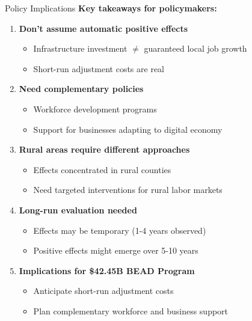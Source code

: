 \documentclass[aspectratio=169]{beamer}
\begin{document}
\begin{frame}{Policy Implications}
\textbf{Key takeaways for policymakers:}

\begin{enumerate}
    \item \textbf{Don't assume automatic positive effects}
    \begin{itemize}
        \item Infrastructure investment $\neq$ guaranteed local job growth
        \item Short-run adjustment costs are real
    \end{itemize}
    
    
    
    \item \textbf{Need complementary policies}
    \begin{itemize}
        \item Workforce development programs
        \item Support for businesses adapting to digital economy
    \end{itemize}
    
    
    
    \item \textbf{Rural areas require different approaches}
    \begin{itemize}
        \item Effects concentrated in rural counties
        \item Need targeted interventions for rural labor markets
    \end{itemize}
    
    
    
    \item \textbf{Long-run evaluation needed}
    \begin{itemize}
        \item Effects may be temporary (1-4 years observed)
        \item Positive effects might emerge over 5-10 years
    \end{itemize}
    
    
    
    \item \textbf{Implications for \$42.45B BEAD Program}
    \begin{itemize}
        \item Anticipate short-run adjustment costs
        \item Plan complementary workforce and business support
    \end{itemize}
\end{enumerate}
\end{frame}
\end{document}
